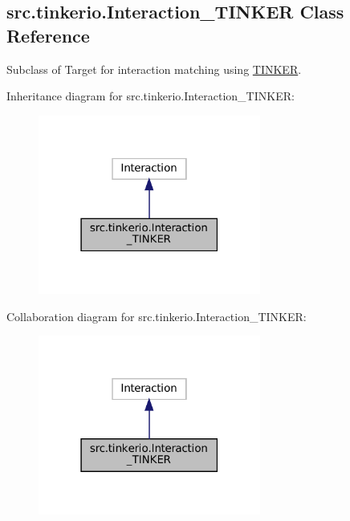 \hypertarget{classsrc_1_1tinkerio_1_1Interaction__TINKER}{}\subsection{src.\+tinkerio.\+Interaction\+\_\+\+T\+I\+N\+K\+ER Class Reference}
\label{classsrc_1_1tinkerio_1_1Interaction__TINKER}


Subclass of Target for interaction matching using \hyperlink{classsrc_1_1tinkerio_1_1TINKER}{T\+I\+N\+K\+ER}.  




Inheritance diagram for src.\+tinkerio.\+Interaction\+\_\+\+T\+I\+N\+K\+ER\+:
\nopagebreak
\begin{figure}[H]
\begin{center}
\leavevmode
\includegraphics[width=207pt]{classsrc_1_1tinkerio_1_1Interaction__TINKER__inherit__graph}
\end{center}
\end{figure}


Collaboration diagram for src.\+tinkerio.\+Interaction\+\_\+\+T\+I\+N\+K\+ER\+:
\nopagebreak
\begin{figure}[H]
\begin{center}
\leavevmode
\includegraphics[width=207pt]{classsrc_1_1tinkerio_1_1Interaction__TINKER__coll__graph}
\end{center}
\end{figure}
